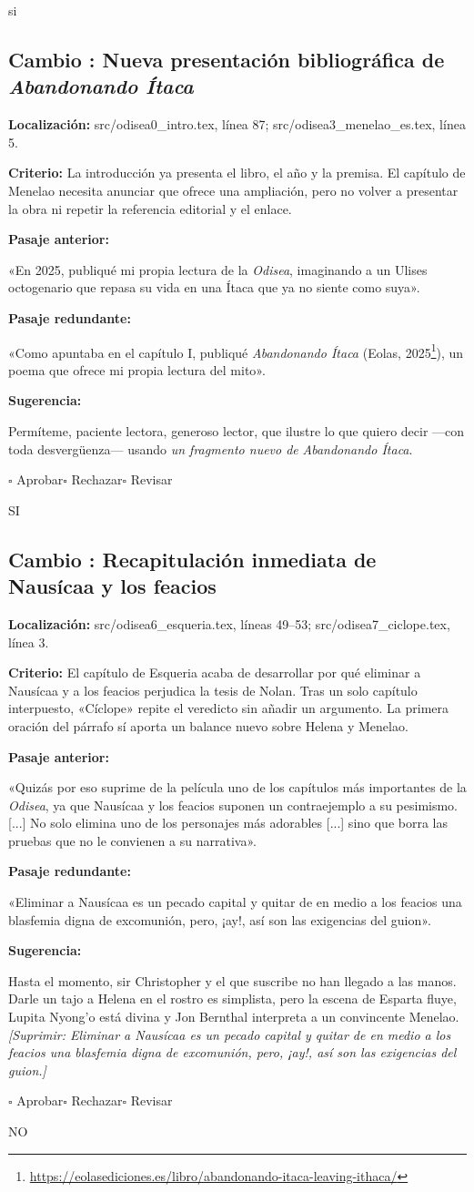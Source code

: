 \documentclass[12pt,a4paper]{article}
\newcommand{\camb}[1]{\textcolor{rojocambio}{\textit{#1}}}
\newcommand{\quita}[1]{\textcolor{rojocambio}{\textit{[Suprimir: #1]}}}
\newcounter{cambio}
\newcommand{\propuesta}[6]{%
  \refstepcounter{cambio}%
  \subsection*{Cambio \thecambio: #1}
  \noindent\textbf{Localización:} #2.\par
  \noindent\textbf{Criterio:} #3\par
  \medskip
  \noindent\textbf{Pasaje anterior:}\par
  #4\par
  \medskip
  \noindent\textbf{Pasaje redundante:}\par
  #5\par
  \medskip
  \noindent\textbf{Sugerencia:}\par
  #6\par
  \medskip
  \noindent$\square$ Aprobar\qquad$\square$ Rechazar\qquad$\square$ Revisar
  \par\bigskip
}
\begin{document}
si

\propuesta
  {Nueva presentación bibliográfica de \emph{Abandonando Ítaca}}
  {src/odisea0\_intro.tex, línea 87; src/odisea3\_menelao\_es.tex, línea 5}
  {La introducción ya presenta el libro, el año y la premisa. El capítulo de Menelao necesita anunciar que ofrece una ampliación, pero no volver a presentar la obra ni repetir la referencia editorial y el enlace.}
  {«En 2025, publiqué mi propia lectura de la \emph{Odisea}, imaginando a un Ulises octogenario que repasa su vida en una Ítaca que ya no siente como suya».}
  {«Como apuntaba en el capítulo I, publiqué \emph{Abandonando Ítaca} (Eolas, 2025\footnote{\url{https://eolasediciones.es/libro/abandonando-itaca-leaving-ithaca/}}), un poema que ofrece mi propia lectura del mito».}
  {Permíteme, paciente lectora, generoso lector, que ilustre lo que quiero decir ---con toda desvergüenza--- usando \camb{un fragmento nuevo de} \emph{Abandonando Ítaca}.}


SI
\propuesta
  {Recapitulación inmediata de Nausícaa y los feacios}
  {src/odisea6\_esqueria.tex, líneas 49--53; src/odisea7\_ciclope.tex, línea 3}
  {El capítulo de Esqueria acaba de desarrollar por qué eliminar a Nausícaa y a los feacios perjudica la tesis de Nolan. Tras un solo capítulo interpuesto, «Cíclope» repite el veredicto sin añadir un argumento. La primera oración del párrafo sí aporta un balance nuevo sobre Helena y Menelao.}
  {«Quizás por eso suprime de la película uno de los capítulos más importantes de la \emph{Odisea}, ya que Nausícaa y los feacios suponen un contraejemplo a su pesimismo. [...] No solo elimina uno de los personajes más adorables [...] sino que borra las pruebas que no le convienen a su narrativa».}
  {«Eliminar a Nausícaa es un pecado capital y quitar de en medio a los feacios una blasfemia digna de excomunión, pero, ¡ay!, así son las exigencias del guion».}
  {Hasta el momento, sir Christopher y el que suscribe no han llegado a las manos. Darle un tajo a Helena en el rostro es simplista, pero la escena de Esparta fluye, Lupita Nyong'o está divina y Jon Bernthal interpreta a un convincente Menelao. \quita{Eliminar a Nausícaa es un pecado capital y quitar de en medio a los feacios una blasfemia digna de excomunión, pero, ¡ay!, así son las exigencias del guion.}}
  
NO
\end{document}
